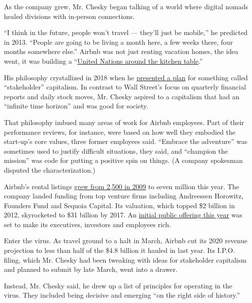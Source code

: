 As the company grew, Mr. Chesky began talking of a world where digital
nomads healed divisions with in-person connections.

``I think in the future, people won't travel --- they'll just be
mobile,'' he predicted in 2013. ``People are going to be living a month
here, a few weeks there, four months somewhere else.'' Airbnb was not
just renting vacation homes, the idea went, it was building a
``\href{https://slate.com/business/2014/02/airbnb-gentrification-how-the-sharing-economy-drives-up-housing-prices.html}{United
Nations around the kitchen table}.''

His philosophy crystallized in 2018 when he
\href{https://news.airbnb.com/brian-cheskys-open-letter-to-the-airbnb-community-about-building-a-21st-century-company/}{presented
a plan} for something called ``stakeholder'' capitalism. In contrast to
Wall Street's focus on quarterly financial reports and daily stock
moves, Mr. Chesky aspired to a capitalism that had an ``infinite time
horizon'' and was good for society.

That philosophy imbued many areas of work for Airbnb employees. Part of
their performance reviews, for instance, were based on how well they
embodied the start-up's core values, three former employees said.
``Embrace the adventure'' was sometimes used to justify difficult
situations, they said, and ``champion the mission'' was code for putting
a positive spin on things. (A company spokesman disputed the
characterization.)

Airbnb's rental listings
\href{https://press.airbnb.com/wp-content/uploads/sites/4/2018/08/The-Airbnb-Story-Timeline-EN-GLOBAL.pdf}{grew
from 2,500 in 2009} to seven million this year. The company landed
funding from top venture firms including Andreessen Horowitz, Founders
Fund and Sequoia Capital. Its valuation, which topped \$2 billion in
2012, skyrocketed to \$31 billion by 2017. An
\href{https://www.nytimes3xbfgragh.onion/2019/09/20/technology/airbnb-employees-ipo-payouts.html}{initial
public offering this year} was set to make its executives, investors and
employees rich.

Enter the virus. As travel ground to a halt in March, Airbnb cut its
2020 revenue projection to less than half of the \$4.8 billion it hauled
in last year. Its I.P.O. filing, which Mr. Chesky had been tweaking with
ideas for stakeholder capitalism and planned to submit by late March,
went into a drawer.

Instead, Mr. Chesky said, he drew up a list of principles for operating
in the virus. They included being decisive and emerging ``on the right
side of history.''

